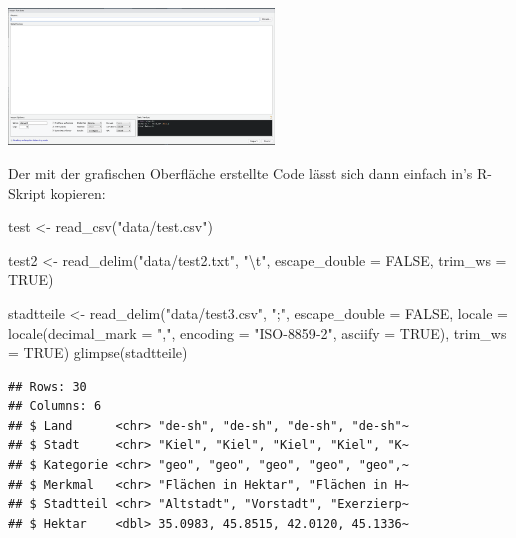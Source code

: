 \documentclass[
]{book}
\newenvironment{Shaded}{\begin{snugshade}}{\end{snugshade}}
\newcommand{\AttributeTok}[1]{\textcolor[rgb]{0.77,0.63,0.00}{#1}}
\newcommand{\ConstantTok}[1]{\textcolor[rgb]{0.00,0.00,0.00}{#1}}
\newcommand{\FunctionTok}[1]{\textcolor[rgb]{0.00,0.00,0.00}{#1}}
\newcommand{\NormalTok}[1]{#1}
\newcommand{\OtherTok}[1]{\textcolor[rgb]{0.56,0.35,0.01}{#1}}
\newcommand{\SpecialCharTok}[1]{\textcolor[rgb]{0.00,0.00,0.00}{#1}}
\newcommand{\StringTok}[1]{\textcolor[rgb]{0.31,0.60,0.02}{#1}}
\begin{document}
\begin{center}\includegraphics[width=200pt]{imgs/read_txt} \end{center}

Der mit der grafischen Oberfläche erstellte Code lässt sich dann einfach in's R-Skript kopieren:

\begin{Shaded}
\begin{Highlighting}[]
\NormalTok{test }\OtherTok{\textless{}{-}} \FunctionTok{read\_csv}\NormalTok{(}\StringTok{"data/test.csv"}\NormalTok{)}

\NormalTok{test2 }\OtherTok{\textless{}{-}} \FunctionTok{read\_delim}\NormalTok{(}\StringTok{"data/test2.txt"}\NormalTok{, }
                    \StringTok{"}\SpecialCharTok{\textbackslash{}t}\StringTok{"}\NormalTok{,}
                    \AttributeTok{escape\_double =} \ConstantTok{FALSE}\NormalTok{, }
                    \AttributeTok{trim\_ws =} \ConstantTok{TRUE}\NormalTok{)}

\NormalTok{stadtteile }\OtherTok{\textless{}{-}} \FunctionTok{read\_delim}\NormalTok{(}\StringTok{"data/test3.csv"}\NormalTok{, }
                    \StringTok{";"}\NormalTok{, }
                    \AttributeTok{escape\_double =} \ConstantTok{FALSE}\NormalTok{, }
                    \AttributeTok{locale =} \FunctionTok{locale}\NormalTok{(}\AttributeTok{decimal\_mark =} \StringTok{","}\NormalTok{, }
                                    \AttributeTok{encoding =} \StringTok{"ISO{-}8859{-}2"}\NormalTok{, }
                                    \AttributeTok{asciify =} \ConstantTok{TRUE}\NormalTok{), }
                    \AttributeTok{trim\_ws =} \ConstantTok{TRUE}\NormalTok{)}
\FunctionTok{glimpse}\NormalTok{(stadtteile)}
\end{Highlighting}
\end{Shaded}

\begin{verbatim}
## Rows: 30
## Columns: 6
## $ Land      <chr> "de-sh", "de-sh", "de-sh", "de-sh"~
## $ Stadt     <chr> "Kiel", "Kiel", "Kiel", "Kiel", "K~
## $ Kategorie <chr> "geo", "geo", "geo", "geo", "geo",~
## $ Merkmal   <chr> "Flächen in Hektar", "Flächen in H~
## $ Stadtteil <chr> "Altstadt", "Vorstadt", "Exerzierp~
## $ Hektar    <dbl> 35.0983, 45.8515, 42.0120, 45.1336~
\end{verbatim}
\end{document}
